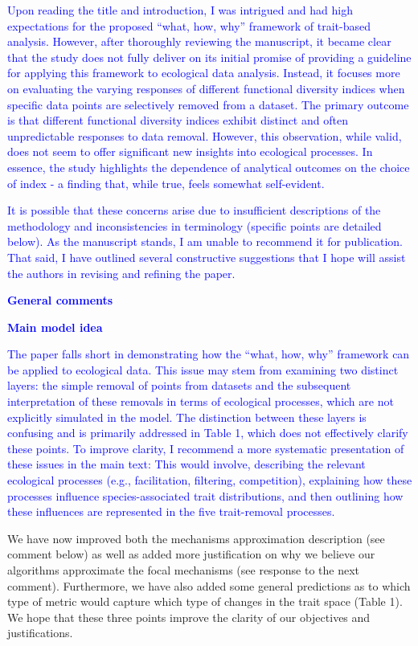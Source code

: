 \documentclass[
]{article}
\begin{document}
\textcolor{blue}{Upon reading the title and introduction, I was intrigued and had high expectations for the proposed ``what, how, why'' framework of trait-based analysis.
However, after thoroughly reviewing the manuscript, it became clear that the study does not fully deliver on its initial promise of providing a guideline for applying this framework to ecological data analysis.
Instead, it focuses more on evaluating the varying responses of different functional diversity indices when specific data points are selectively removed from a dataset.
The primary outcome is that different functional diversity indices exhibit distinct and often unpredictable responses to data removal.
However, this observation, while valid, does not seem to offer significant new insights into ecological processes.
In essence, the study highlights the dependence of analytical outcomes on the choice of index - a finding that, while true, feels somewhat self-evident.}

\textcolor{blue}{It is possible that these concerns arise due to insufficient descriptions of the methodology and inconsistencies in terminology (specific points are detailed below).
As the manuscript stands, I am unable to recommend it for publication.
That said, I have outlined several constructive suggestions that I hope will assist the authors in revising and refining the paper.}

\textcolor{blue}{\textbf{General comments}}

\textcolor{blue}{\textbf{Main model idea}}

\textcolor{blue}{The paper falls short in demonstrating how the ``what, how, why'' framework can be applied to ecological data.
This issue may stem from examining two distinct layers: the simple removal of points from datasets and the subsequent interpretation of these removals in terms of ecological processes, which are not explicitly simulated in the model.
The distinction between these layers is confusing and is primarily addressed in Table 1, which does not effectively clarify these points.
To improve clarity, I recommend a more systematic presentation of these issues in the main text: This would involve, describing the relevant ecological processes (e.g., facilitation, filtering, competition), explaining how these processes influence species-associated trait distributions, and then outlining how these influences are represented in the five trait-removal processes.}

We have now improved both the mechanisms approximation description (see comment below) as well as added more justification on why we believe our algorithms approximate the focal mechanisms (see response to the next comment).
Furthermore, we have also added some general predictions as to which type of metric would capture which type of changes in the trait space (Table 1).
We hope that these three points improve the clarity of our objectives and justifications.
\end{document}
